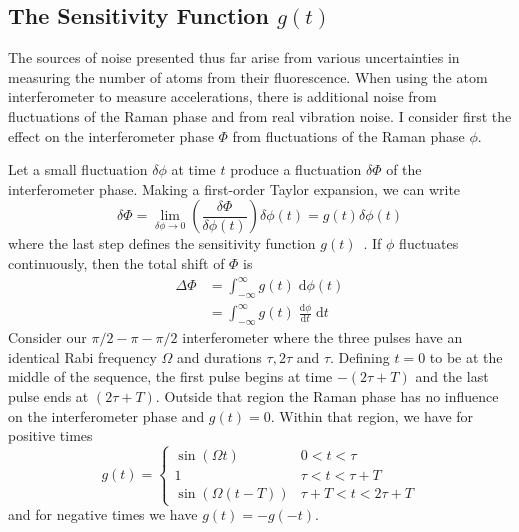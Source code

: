 \subsection{The Sensitivity Function $g(t)$}\label{subsec:sens_func}
The sources of noise presented thus far arise from various 
uncertainties in measuring the number of atoms from their
fluorescence. When using the atom interferometer to measure
accelerations, there is additional noise from fluctuations of the
Raman phase and from real vibration noise. I consider first the effect
on the interferometer phase $\Phi$ from fluctuations of the Raman
phase $\phi$.
\par\noindent
Let a small fluctuation $\delta \phi$ at time $t$ produce a
fluctuation $\delta \Phi$ of the interferometer phase. Making a
first-order Taylor expansion, we can write
\begin{equation}
  \delta \Phi = \lim_{\delta\phi \rightarrow 0} \left(\frac{\delta
  \Phi}{\delta \phi(t)}\right) \delta \phi(t) = g(t) \delta \phi(t)
\end{equation}
where the last step defines the sensitivity function
$g(t)$~\cite{Dick1987}. If $\phi$ fluctuates continuously, then the
total shift of $\Phi$ is
\begin{align}
  \Delta\Phi &= \int_{-\infty}^\infty g(t)\;\mathrm{d}\phi(t)
  \nonumber\\
  &= \int_{-\infty}^\infty g(t)\;\frac{\mathrm{d}\phi}{\mathrm{d} t}\;
  \mathrm{d}t
  \label{eq:phase_contrib}
\end{align}
Consider our \(\pi/2-\pi-\pi/2\) interferometer where the three pulses
have an identical Rabi frequency $\Omega$ and  
durations \(\tau, 2\tau\) and \(\tau\). Defining \(t=0\) to be at
the middle of the sequence, the first pulse begins at time $-(2 \tau +
T)$ and the last pulse ends at $(2\tau + T)$. Outside that region the
Raman phase has no influence on the interferometer phase and $g(t) =
0$. Within that region, we have for positive times~\cite{Cheinet2008}
\begin{equation}
    g(t) = 
    \begin{cases}
      \sin ( \Omega t) & 0<t<\tau  \\
      1 & \tau <t<\tau +T \\
      \sin (\Omega  (t-T)) & \tau +T<t<2 \tau +T
  \end{cases}
\label{eq:sensitivity_interferometer}
\end{equation}
and for negative times we have $g(t) = - g(-t)$.

